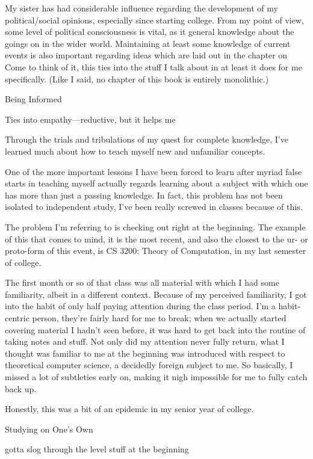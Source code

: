 \documentclass[../butidigress.tex]{subfiles}
\begin{document}
My sister has had considerable influence regarding the development of my political/social opinions, especially since starting college.
From my point of view, some level of political consciousness is vital, as it general knowledge about the goings on in the wider world.
Maintaining at least some knowledge of current events is also important regarding ideas which are laid out in the chapter on 
Come to think of it, this ties into the stuff I talk about in  at least it does for me specifically.
(Like I said, no chapter of this book is entirely monolithic.)

\begin{somenotes}{Being Informed}
    \item Ties into empathy---reductive, but it helps me 
\end{somenotes}

Through the trials and tribulations of my quest for complete knowledge, I've learned much about how to teach myself new and unfamiliar concepts.


\entryskip

One of the more important lessons I have been forced to learn after myriad false starts in teaching myself actually regards learning about a subject with which one has more than just a passing knowledge.
In fact, this problem has not been isolated to independent study, I've been really screwed in classes because of this.

The problem I'm referring to is checking out right at the beginning.
The example of this that comes to mind, it is the most recent, and also the closest to the ur- or proto-form of this event, is CS 3200: Theory of Computation, in my last semester of college.

The first month or so of that class was all material with which I had some familiarity, albeit in a different context.
Because of my perceived familiarity, I got into the habit of only half paying attention during the class period.
I'm a habit-centric person, they're fairly hard for me to break; when we actually started covering material I hadn't seen before, it was hard to get back into the routine of taking notes and stuff.
Not only did my attention never fully return, what I thought was familiar to me at the beginning was introduced with respect to theoretical computer science, a decidedly foreign subject to me.
So basically, I missed a lot of subtleties early on, making it nigh impossible for me to fully catch back up.

Honestly, this  was a bit of an epidemic in my senior year of college.

\begin{somenotes}{Studying on One's Own}
    \item gotta slog through the  level stuff at the beginning
\end{somenotes}
\end{document}
